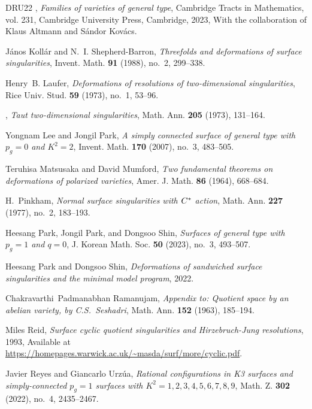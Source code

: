 \documentclass{amsart}
\theoremstyle{definition}
\theoremstyle{remark}
\begin{document}
\begin{thebibliography}{DRU22}
\bysame, \emph{Families of varieties of general type}, Cambridge Tracts in
  Mathematics, vol. 231, Cambridge University Press, Cambridge, 2023, With the
  collaboration of Klaus Altmann and S{\'a}ndor Kov{\'a}cs. 

J{\'a}nos Koll{\'a}r and N.~I. Shepherd-Barron, \emph{Threefolds and
  deformations of surface singularities}, Invent. Math. \textbf{91} (1988),
  no.~2, 299--338.

Henry~B. Laufer, \emph{Deformations of resolutions of two-dimensional
  singularities}, Rice Univ. Stud. \textbf{59} (1973), no.~1, 53--96.

\bysame, \emph{Taut two-dimensional singularities}, Math. Ann. \textbf{205}
  (1973), 131--164. 

Yongnam Lee and Jongil Park, \emph{A simply connected surface of general type
  with {$p_g=0$} and {$K^2=2$}}, Invent. Math. \textbf{170} (2007), no.~3,
  483--505. 

Teruhisa Matsusaka and David Mumford, \emph{Two fundamental theorems on
  deformations of polarized varieties}, Amer. J. Math. \textbf{86} (1964),
  668--684. 

H.~Pinkham, \emph{Normal surface singularities with {$C\sp*$} action}, Math.
  Ann. \textbf{227} (1977), no.~2, 183--193. 

Heesang Park, Jongil Park, and Dongsoo Shin, \emph{Surfaces of general type
  with $p_g=1$ and $q=0$}, J. Korean Math. Soc. \textbf{50} (2023), no.~3,
  493--507.

Heesang Park and Dongsoo Shin, \emph{Deformations of sandwiched surface
  singularities and the minimal model program}, 2022.

Chakravarthi~Padmanabhan Ramanujam, \emph{Appendix to: {Q}uotient space by an
  abelian variety, by {C}.{S}.~{S}eshadri}, Math. Ann. \textbf{152} (1963),
  185--194.

Miles Reid, \emph{Surface cyclic quotient singularities and {H}irzebruch-{J}ung
  resolutions}, 1993, Available at
  \url{https://homepages.warwick.ac.uk/~masda/surf/more/cyclic.pdf}.

Javier Reyes and Giancarlo Urz\'{u}a, \emph{Rational configurations in {K}3
  surfaces and simply-connected {$p_g=1$} surfaces with
  {$K^2=1,2,3,4,5,6,7,8,9$}}, Math. Z. \textbf{302} (2022), no.~4, 2435--2467.


\end{thebibliography}
\end{document}
